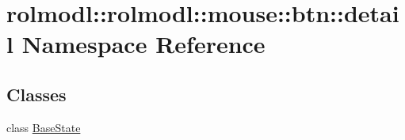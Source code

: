 \hypertarget{namespacerolmodl_1_1rolmodl_1_1mouse_1_1btn_1_1detail}{}\section{rolmodl\+::rolmodl\+::mouse\+::btn\+::detail Namespace Reference}
\label{namespacerolmodl_1_1rolmodl_1_1mouse_1_1btn_1_1detail}
\subsection*{Classes}
\begin{DoxyCompactItemize}
\item 
class \mbox{\hyperlink{classrolmodl_1_1rolmodl_1_1mouse_1_1btn_1_1detail_1_1_base_state}{Base\+State}}
\end{DoxyCompactItemize}
